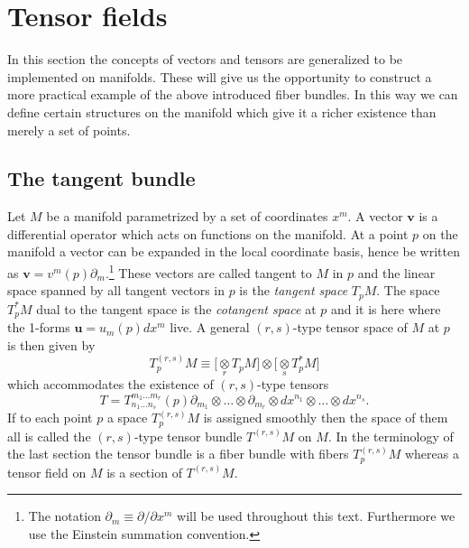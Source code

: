 \documentclass[12pt,twoside]{book}
\begin{document}
\section{Tensor fields}

In this section the concepts of vectors and tensors are generalized to be implemented on manifolds. These will give us the opportunity to construct a more practical example of the above introduced fiber bundles. In this way we can define certain structures on the manifold which give it a richer existence than merely a set of points.

\subsection{The tangent bundle}

Let $M$ be a manifold parametrized by a set of coordinates $x^{m}$. A vector $\mathbf{v}$ is a differential operator which acts on functions on the manifold. At a point $p$ on the manifold a vector can be expanded in the local coordinate basis, hence be written as $\mathbf{v}=v^{m}(p)\partial_{m}$.\footnote{
The notation $\partial_{m}\equiv\partial /\partial x^{m}$ will be used throughout this text. Furthermore we use the Einstein summation convention.}
These vectors are called tangent to $M$ in $p$ and the linear space spanned by all tangent vectors in $p$ is the \emph{tangent space} $T_{p}M$. The space $T_{p}^{*}M$ dual to the tangent space is the \emph{cotangent space} at $p$ and it is here where the 1-forms $\mathbf{u}=u_{m}(p)dx^{m}$ live. A general $(r,s)$-type tensor space of $M$ at $p$ is then given by
\begin{equation}
T_{p}^{(r,s)}M \equiv \Big[\underset{r}{\otimes} T_{p}M\Big] \otimes \Big[\underset{s}{\otimes} T_{p}^{*}M\Big]
\end{equation} which accommodates the existence of $(r,s)$-type tensors
\begin{equation}
T=T^{m_{1}\dots m_{r}}_{n_{1}\dots n_{s}}(p)\partial_{m_{1}}\otimes\ldots\otimes\partial_{m_{r}}\otimes dx^{n_{1}}\otimes\ldots\otimes dx^{n_{s}}.
\end{equation}
If to each point $p$ a space $T_{p}^{(r,s)}M$ is assigned smoothly then the space of them all is called the $(r,s)$-type tensor bundle $T^{(r,s)}M$ on $M$. In the terminology of the last section the tensor bundle is a fiber bundle with fibers $T_{p}^{(r,s)}M$ whereas a tensor field on $M$ is a section of $T^{(r,s)}M$.
\end{document}
